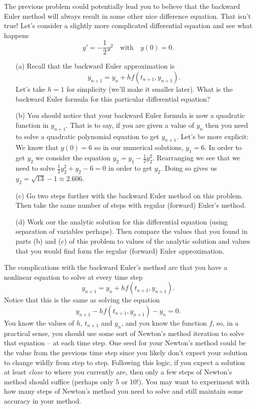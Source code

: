 \begin{problem}
    The previous problem could potentially lead you to believe that the backward Euler
    method will always result in some other nice difference equation.  That isn't true!
    Let's consider a slightly more complicated differential equation and see what happens
    \[ y' = -\frac{1}{2} y^2 \quad \text{with} \quad y(0) = 0. \]
    \begin{enumerate}
        \item[(a)] Recall that the backward Euler approximation is 
            \[ y_{n+1} = y_n + h f(t_{n+1},y_{n+1}). \]
            Let's take $h=1$ for simplicity (we'll make it smaller later).  What is the
            backward Euler formula for this particular differential equation?
        \item[(b)] You should notice that your backward Euler formula is now a quadratic
            function in $y_{n+1}$.  That is to say, if you are given a value of $y_n$ then
            you need to solve a quadratic polynomial equation to get $y_{n+1}$.  Let's be
            more explicit: \\
            We know that $y(0) = 6$ so in our numerical solutions, $y_1 = 6$.  In order to
            get $y_2$ we consider the equation $y_2 = y_1 - \frac{1}{2} y_2^2$.
            Rearranging we see that we need to solve $\frac{1}{2}y_2^2 + y_2 - 6 = 0$
            in order to get $y_2$.  Doing so gives us $y_2 = \sqrt{13} - 1 \approx 2.606$.
        \item[(c)] Go two steps further with the backward Euler method on this problem.
            Then take the same number of steps with regular (forward) Euler's method.
        \item[(d)] Work our the analytic solution for this differential equation (using
            separation of variables perhaps).  Then compare the values that you found in
            parts (b) and (c) of this problem to values of the analytic solution and
            values that you would find form the regular (forward) Euler approximation.
    \end{enumerate}
\end{problem}

The complications with the backward Euler's method are that you have a nonlinear equation
to solve at every time step
\[ y_{n+1} = y_n + h f(t_{n+1}, y_{n+1}). \]
Notice that this is the same as solving the equation
\[ y_{n+1} - hf(t_{n+1},y_{n+1}) - y_n = 0. \]
You know the values of $h$, $t_{n+1}$ and $y_n$, and you know the function $f$, so, in a practical sense, you should use some sort of Newton's
method iteration to solve that equation -- at each time step.  One seed for your Newton's method could be the
value from the previous time step since you likely don't expect your solution to change
wildly from step to step.  Following this logic, if you expect a solution at least {\it
close} to where you currently are, then only a few steps of Newton's method should suffice
(perhaps only 5 or 10!).  You may want to experiment with how many steps of Newton's
method you need to solve and still maintain some accuracy in your method.


